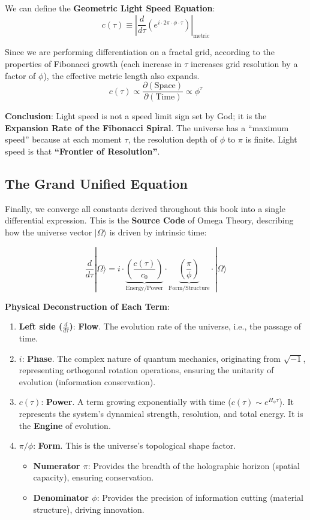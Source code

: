 We can define the \textbf{Geometric Light Speed Equation}:
\[c(\tau) \equiv \left| \frac{d}{d\tau} \left( e^{i \cdot 2\pi \cdot \phi \cdot \tau} \right) \right|_{\text{metric}}\]

Since we are performing differentiation on a fractal grid, according to the properties of Fibonacci growth (each increase in $\tau$ increases grid resolution by a factor of $\phi$), the effective metric length also expands.
\[c(\tau) \propto \frac{\partial (\text{Space})}{\partial (\text{Time})} \propto \phi^{\tau}\]

\textbf{Conclusion}:
Light speed is not a speed limit sign set by God; it is the \textbf{Expansion Rate of the Fibonacci Spiral}.
The universe has a ``maximum speed'' because at each moment $\tau$, the resolution depth of $\phi$ to $\pi$ is finite. Light speed is that \textbf{``Frontier of Resolution''}.

\subsection{The Grand Unified Equation}

Finally, we converge all constants derived throughout this book into a single differential expression. This is the \textbf{Source Code} of Omega Theory, describing how the universe vector $|\Omega\rangle$ is driven by intrinsic time:

\[\frac{d}{d\tau} |\Omega\rangle = i \cdot \underbrace{\left( \frac{c(\tau)}{c_0} \right)}_{\text{Energy/Power}} \cdot \underbrace{\left( \frac{\pi}{\phi} \right)}_{\text{Form/Structure}} \cdot |\Omega\rangle\]

\textbf{Physical Deconstruction of Each Term}:

\begin{enumerate}
\item \textbf{Left side ($\frac{d}{d\tau}$)}: \textbf{Flow}. The evolution rate of the universe, i.e., the passage of time.
\item \textbf{$i$}: \textbf{Phase}. The complex nature of quantum mechanics, originating from $\sqrt{-1}$, representing orthogonal rotation operations, ensuring the unitarity of evolution (information conservation).
\item \textbf{$c(\tau)$}: \textbf{Power}. A term growing exponentially with time ($c(\tau) \sim e^{H_\phi \tau}$). It represents the system's dynamical strength, resolution, and total energy. It is the \textbf{Engine} of evolution.
\item \textbf{$\pi / \phi$}: \textbf{Form}. This is the universe's topological shape factor.
   \begin{itemize}
   \item \textbf{Numerator $\pi$}: Provides the breadth of the holographic horizon (spatial capacity), ensuring conservation.
   \item \textbf{Denominator $\phi$}: Provides the precision of information cutting (material structure), driving innovation.
   \end{itemize}
\end{enumerate}

